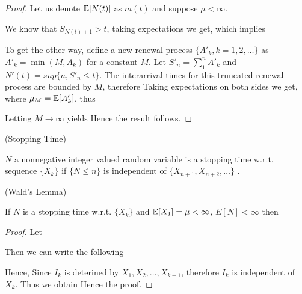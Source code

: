 \documentclass[a4paper,10pt, english]{article}
\begin{document}
\begin{proof}
Let us denote $\mathbb{E}[N(t)]$ as $m(t)$ and suppose $\mu < \infty$.

We know that $S_{N(t)+1} > t$, taking expectations we get,
which implies 

To get the other way, define a new renewal process $\{ A'_k, k=1,2,\dots \}$ as $A'_k= \min(M,A_k)$ for a constant $M$.
Let $S'_n=\sum_1^n A'_k$ and $N'(t) = sup\{n,S'_n \le t\}$. The interarrival times for this truncated renewal process are bounded by $M$, therefore
Taking expectations on both sides we get,
where $\mu_M = \mathbb{E}[A'_k]$, thus

Letting $M \to \infty$ yields
Hence the result follows.
\end{proof}

\begin{defn}
(Stopping Time)

$N$ a nonnegative integer valued random variable is a stopping time w.r.t. sequence $\{X_k\}$ if $\{ N\le n\}$ is independent of $\{X_{n+1}, X_{n+2}, \dots\}$ .
\end{defn}

\begin{thm}
(Wald's Lemma)

If $N$ is a stopping time w.r.t. $\{X_k\}$ and $\mathbb{E}[X_1] = \mu < \infty$, $E[N] < \infty$ then
\end{thm}

\begin{proof}
Let 

Then we can write the following

Hence,
Since $I_k$ is deterined by $X_1, X_2, \dots, X_{k-1}$, therefore $I_k$ is independent of $X_k$. Thus we obtain
Hence the proof.
\end{proof}
\end{document}
